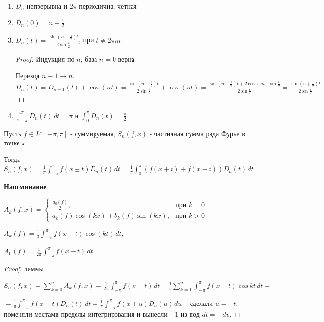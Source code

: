 \begin{properties}
    \begin{enumerate}
        \item $D_n$ непрерывна и $2\pi$ периодична, чётная
        \item $D_n (0) = n + \frac{1}{2}$
        \item {
            $D_n (t) = \frac{\sin (n + \frac{1}{2})t}{2\sin \frac{t}{2}}$, при $t \neq 2\pi m$

            \begin{proof}
                Индукция по $n$, база $n = 0$ верна

                Переход $n - 1 \to n$. $D_{n} (t) = D_{n - 1} (t) + \cos (nt) = \frac{\sin (n - \frac{1}{2})t}{2\sin \frac{t}{2}} + \cos (nt) = \frac{\sin (n - \frac{1}{2})t + 2\cos (nt) \sin \frac{t}{2}}{2\sin \frac{t}{2}} = \frac{\sin (n + \frac{1}{2})t}{2\sin \frac{t}{2}}$
            \end{proof}
        }
        \item $\int_{-\pi}^\pi D_n (t) \, dt = \pi$ и $\int_0^\pi D_n (t) = \frac{\pi}{2}$
    \end{enumerate}
\end{properties}

\begin{lemma}
    Пусть $f \in L^1 [-\pi, \pi]$ - суммируемая, $S_n (f, x)$ - частичная сумма ряда Фурье в точке $x$

    Тогда $S_n (f, x) = \frac{1}{\pi} \int_{-\pi}^\pi f(x \pm t) D_n (t) \, dt = \frac{1}{\pi} \int_0^\pi (f(x + t) + f(x - t)) D_n (t) \, dt$
\end{lemma}

\textbf{Напоминание}

$A_k (f, x) = 
\begin{cases}
    \frac{a_0 (f)}{2}, & \text{при $k = 0$} \\
    a_k (f) \cos (kx) + b_k (f) \sin (kx), & \text{при $k > 0$}
\end{cases}$

$A_k (f) = \frac{1}{\pi} \int_{-\pi}^\pi f(x - t) \cos (kt) \, dt$,

$A_0 (f) = \frac{1}{2\pi} \int_{-\pi}^\pi f(x - t) \, dt$

\begin{proof}
    леммы

    $S_n (f, x) = \sum_{k = 0}^n A_k (f, x) = \frac{1}{2\pi} \int_{-\pi}^\pi f(x - t) \, dt +  \frac{1}{\pi} \sum_{k = 1}^{n} \int_{-\pi}^\pi f(x - t) \cos kt \, dt = $
    
    $=\frac{1}{\pi} \int_{-\pi}^\pi f(x - t) D_n (t) \, dt = \frac{1}{\pi} \int_{-\pi}^\pi f(x + u) D_n (u) \, du$ -- сделали $u = -t$, поменяли местами пределы интегрирования и вынесли $-1$ из-под $dt = -du$. 
\end{proof}

